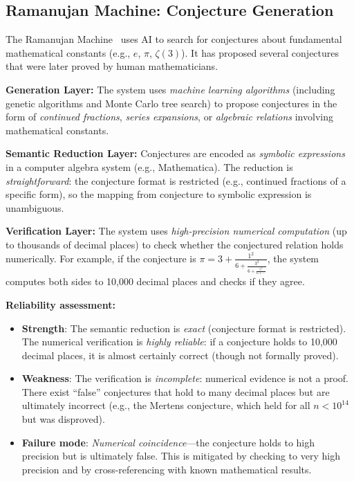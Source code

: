 \documentclass[11pt,a4paper]{article}
\begin{document}
\subsection{Ramanujan Machine: Conjecture Generation}

The Ramanujan Machine~\cite{raayoni2021generating} uses AI to search for conjectures about fundamental mathematical constants (e.g., $e$, $\pi$, $\zeta(3)$). It has proposed several conjectures that were later proved by human mathematicians.

\textbf{Generation Layer:} The system uses \emph{machine learning algorithms} (including genetic algorithms and Monte Carlo tree search) to propose conjectures in the form of \emph{continued fractions}, \emph{series expansions}, or \emph{algebraic relations} involving mathematical constants.

\textbf{Semantic Reduction Layer:} Conjectures are encoded as \emph{symbolic expressions} in a computer algebra system (e.g., Mathematica). The reduction is \emph{straightforward}: the conjecture format is restricted (e.g., continued fractions of a specific form), so the mapping from conjecture to symbolic expression is unambiguous.

\textbf{Verification Layer:} The system uses \emph{high-precision numerical computation} (up to thousands of decimal places) to check whether the conjectured relation holds numerically. For example, if the conjecture is $\pi = 3 + \frac{1^2}{6 + \frac{3^2}{6 + \frac{5^2}{6 + \cdots}}}$, the system computes both sides to 10,000 decimal places and checks if they agree.

\textbf{Reliability assessment:}
\begin{itemize}
  \item \textbf{Strength}: The semantic reduction is \emph{exact} (conjecture format is restricted). The numerical verification is \emph{highly reliable}: if a conjecture holds to 10,000 decimal places, it is almost certainly correct (though not formally proved).
  \item \textbf{Weakness}: The verification is \emph{incomplete}: numerical evidence is not a proof. There exist ``false'' conjectures that hold to many decimal places but are ultimately incorrect (e.g., the Mertens conjecture, which held for all $n < 10^{14}$ but was disproved).
  \item \textbf{Failure mode}: \emph{Numerical coincidence}---the conjecture holds to high precision but is ultimately false. This is mitigated by checking to very high precision and by cross-referencing with known mathematical results.
\end{itemize}
\end{document}
